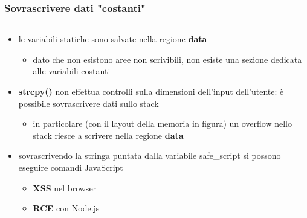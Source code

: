 \documentclass{beamer}
\newcommand\Fontvi{\fontsize{9.5}{7.2}\selectfont}
\begin{document}
\begin{frame}
  \frametitle{Sovrascrivere dati "costanti"}
  \Fontvi
  \begin{columns}
    \begin{column}{0.55\textwidth}
      \begin{itemize}
        \item le variabili statiche sono salvate nella regione \textbf{data}
        \begin{itemize}
          \item dato che non esistono aree non scrivibili, non esiste una
            sezione dedicata alle variabili costanti         
        \end{itemize}
      \item \textbf{strcpy()} non effettua controlli sulla dimensioni dell'input
          dell'utente: è possibile sovrascrivere dati sullo stack
        \begin{itemize}
          \item in particolare (con il layout della memoria in figura) un
            overflow nello stack riesce a scrivere nella regione \textbf{data}
        \end{itemize}
        \item sovrascrivendo la stringa puntata dalla variabile safe\_script si
          possono eseguire comandi JavaScript
        \begin{itemize}
          \item \textbf{XSS} nel browser
          \item \textbf{RCE} con Node.js
        \end{itemize}


\end{itemize}
\end{column}
\end{columns}
\end{frame}
\end{document}
